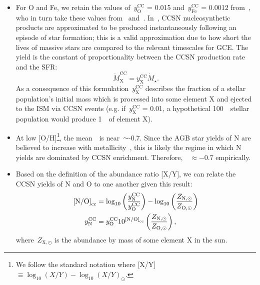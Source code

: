 \documentclass[ms.tex]{subfiles}
\begin{document}
\begin{itemize} 
	\item For O and Fe, we retain the values of~$y_\text{O}^\text{CC}$ = 0.015 
	and~$y_\text{Fe}^\text{CC}$ = 0.0012 from~\citet{Johnson2021}, who in turn 
	take these values from~\citet{Johnson2020} and~\citet{Weinberg2017}. 
	In~\vice, CCSN nucleosynthetic products are approximated to be produced 
	instantaneously following an episode of star formation; this is a valid 
	approximation due to how short the lives of massive stars are compared to 
	the relevant timescales for GCE. 
	The yield is the constant of proportionality between the CCSN production 
	rate and the SFR: 
	\begin{equation} 
	\dot{M}_\text{X}^\text{CC} = y_\text{X}^\text{CC}\dot{M}_\star. 
	\end{equation} 
	As a consequence of this formulation~$y_\text{X}^\text{CC}$ describes the 
	fraction of a stellar population's initial mass which is processed into 
	some element X and ejected to the ISM via CCSN events 
	(e.g. if~$y_\text{X}^\text{CC}$ = 0.01, a hypothetical 100~\msun~stellar 
	population would produce 1~\msun~of element X). 

	\item At low [O/H]\footnote{
		We follow the standard notation where 
		[X/Y]~$\equiv \log_{10}(X/Y) - \log_{10}(X/Y)_\odot$. 
	}, the mean~\no~is near~$\sim$-0.7. 
	Since the AGB star yields of N are believed to increase with 
	metallicity~\citep{Cristallo2011, Cristallo2015, Ventura2013}, this is 
	likely the regime in which N yields are dominated by CCSN enrichment. 
	Therefore,~\no\subcc~$\approx -0.7$ empirically. 

	\item Based on the definition of the abundance ratio [X/Y], we can relate 
	the CCSN yields of N and O to one another given this result: 
	\begin{subequations}\begin{align} 
	\text{[N/O]}_\text{cc} &= 
	\log_{10}\left(\frac{y_\text{N}^\text{CC}}{y_\text{O}^\text{CC}}\right) - 
	\log_{10}\left(\frac{Z_{\text{N},\odot}}{Z_{\text{O},\odot}}\right) 
	\label{eq:no_cc}
	\\ 
	y_\text{N}^\text{CC} &= 
	y_\text{O}^\text{CC} 10^{\text{[N/O]}_\text{cc}} 
	\left(\frac{Z_{\text{N},\odot}}{Z_{\text{O},\odot}}\right), 
	\end{align}\end{subequations} 
	where~$Z_{\text{X},\odot}$ is the abundance by mass of some element X in 
	the sun. 


\end{itemize}
\end{document}
